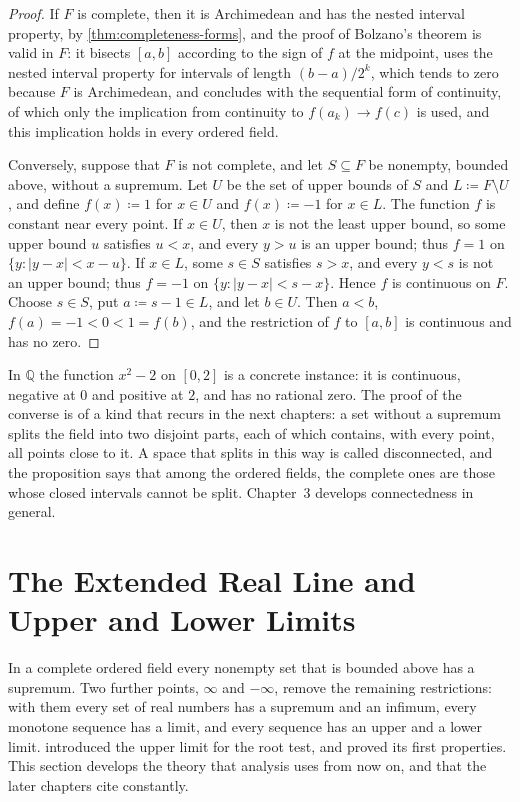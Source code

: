 \begin{proof}
If $F$ is complete, then it is Archimedean and has the nested interval property, by \cref{thm:completeness-forms}, and the proof of Bolzano's theorem  is valid in $F$: it bisects $[a,b]$ according to the sign of $f$ at the midpoint, uses the nested interval property for intervals of length $(b-a)/2^k$, which tends to zero because $F$ is Archimedean, and concludes with the sequential form of continuity, of which only the implication from continuity to $f(a_k)\to f(c)$ is used, and this implication holds in every ordered field.

Conversely, suppose that $F$ is not complete, and let $S\subseteq F$ be nonempty, bounded above, without a supremum. Let $U$ be the set of upper bounds of $S$ and $L\coloneqq F\setminus U$, and define $f(x)\coloneqq1$ for $x\in U$ and $f(x)\coloneqq-1$ for $x\in L$. The function $f$ is constant near every point. If $x\in U$, then $x$ is not the least upper bound, so some upper bound $u$ satisfies $u<x$, and every $y>u$ is an upper bound; thus $f=1$ on $\{y: |y-x|<x-u\}$. If $x\in L$, some $s\in S$ satisfies $s>x$, and every $y<s$ is not an upper bound; thus $f=-1$ on $\{y: |y-x|<s-x\}$. Hence $f$ is continuous on $F$. Choose $s\in S$, put $a\coloneqq s-1\in L$, and let $b\in U$. Then $a<b$, $f(a)=-1<0<1=f(b)$, and the restriction of $f$ to $[a,b]$ is continuous and has no zero.
\end{proof}

In $\mathbb Q$ the function $x^2-2$ on $[0,2]$ is a concrete instance: it is continuous, negative at $0$ and positive at $2$, and has no rational zero. The proof of the converse is of a kind that recurs in the next chapters: a set without a supremum splits the field into two disjoint parts, each of which contains, with every point, all points close to it. A space that splits in this way is called disconnected, and the proposition says that among the ordered fields, the complete ones are those whose closed intervals cannot be split. Chapter~3 develops connectedness in general.

\section{The Extended Real Line and Upper and Lower Limits}
\label{sec:extended-limsup}

In a complete ordered field every nonempty set that is bounded above has a supremum. Two further points, $\infty$ and $-\infty$, remove the remaining restrictions: with them every set of real numbers has a supremum and an infimum, every monotone sequence has a limit, and every sequence has an upper and a lower limit.  introduced the upper limit for the root test, and  proved its first properties. This section develops the theory that analysis uses from now on, and that the later chapters cite constantly.


